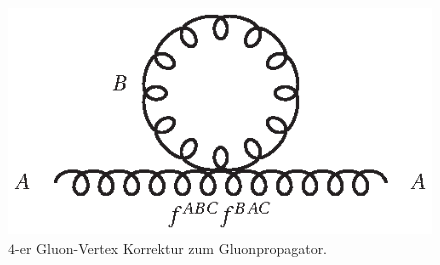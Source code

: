 \begin{figure}[h]
 \centering
 \includegraphics{abschnitte/n-schleifen/fig/QCD2.eps}
 \caption{$4$-er Gluon-Vertex Korrektur zum Gluonpropagator.}\label{fig:n-schleifen:QCD2}
\end{figure}

